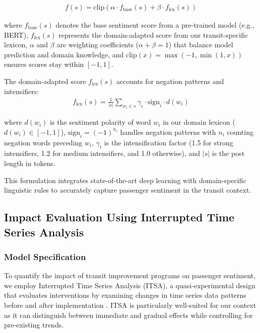 \documentclass[a4paper,fleqn,12pt]{cas-sc}
\begin{document}
\begin{align}
f(s) = \text{clip}\left( \alpha \cdot f_{\text{base}}(s) + \beta \cdot f_{\text{lex}}(s) \right)
\end{align}

where $f_{\text{base}}(s)$ denotes the base sentiment score from a pre-trained model (e.g., BERT), $f_{\text{lex}}(s)$ represents the domain-adapted score from our transit-specific lexicon, $\alpha$ and $\beta$ are weighting coefficients ($\alpha + \beta = 1$) that balance model prediction and domain knowledge, and $\text{clip}(x) = \max(-1, \min(1, x))$ ensures scores stay within $[-1, 1]$.

The domain-adapted score $f_{\text{lex}}(s)$ accounts for negation patterns and intensifiers:
\begin{align}
f_{\text{lex}}(s) = \frac{1}{|s|} \sum_{w_i \in s} \gamma_i \cdot \text{sign}_i \cdot d(w_i)
\end{align}

where $d(w_i)$ is the sentiment polarity of word $w_i$ in our domain lexicon ($d(w_i) \in [-1, 1]$), $\text{sign}_i = (-1)^{n_i}$ handles negation patterns with $n_i$ counting negation words preceding $w_i$, $\gamma_i$ is the intensification factor (1.5 for strong intensifiers, 1.2 for medium intensifiers, and 1.0 otherwise), and $|s|$ is the post length in tokens.

This formulation integrates state-of-the-art deep learning with domain-specific linguistic rules to accurately capture passenger sentiment in the transit context.

\subsection{Impact Evaluation Using Interrupted Time Series Analysis}

\subsubsection{Model Specification}

To quantify the impact of transit improvement programs on passenger sentiment, we employ Interrupted Time Series Analysis (ITSA), a quasi-experimental design that evaluates interventions by examining changes in time series data patterns before and after implementation \citep{bernal2017interrupted}. ITSA is particularly well-suited for our context as it can distinguish between immediate and gradual effects while controlling for pre-existing trends.
\end{document}
